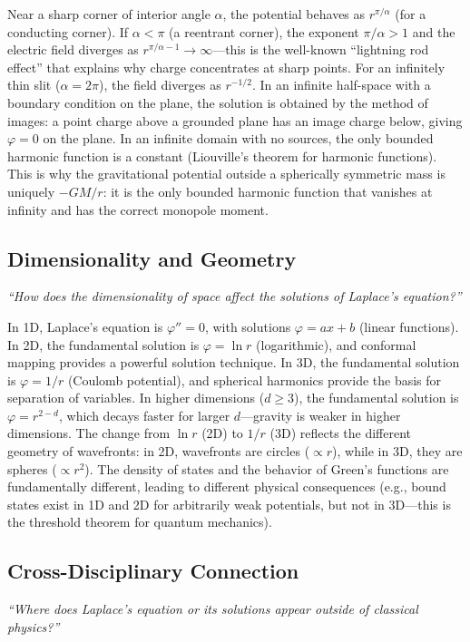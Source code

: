 \documentclass[11pt,openright]{book}
\begin{document}
Near a sharp corner of interior angle $\alpha$, the potential behaves as $r^{\pi/\alpha}$ (for a conducting corner). If $\alpha < \pi$ (a reentrant corner), the exponent $\pi/\alpha > 1$ and the electric field diverges as $r^{\pi/\alpha - 1} \to \infty$---this is the well-known ``lightning rod effect'' that explains why charge concentrates at sharp points. For an infinitely thin slit ($\alpha = 2\pi$), the field diverges as $r^{-1/2}$. In an infinite half-space with a boundary condition on the plane, the solution is obtained by the method of images: a point charge above a grounded plane has an image charge below, giving $\varphi = 0$ on the plane. In an infinite domain with no sources, the only bounded harmonic function is a constant (Liouville's theorem for harmonic functions). This is why the gravitational potential outside a spherically symmetric mass is uniquely $-GM/r$: it is the only bounded harmonic function that vanishes at infinity and has the correct monopole moment.

\subsection*{Dimensionality and Geometry}
\textit{``How does the dimensionality of space affect the solutions of Laplace's equation?''}

In 1D, Laplace's equation is $\varphi'' = 0$, with solutions $\varphi = ax + b$ (linear functions). In 2D, the fundamental solution is $\varphi = \ln r$ (logarithmic), and conformal mapping provides a powerful solution technique. In 3D, the fundamental solution is $\varphi = 1/r$ (Coulomb potential), and spherical harmonics provide the basis for separation of variables. In higher dimensions ($d \geq 3$), the fundamental solution is $\varphi = r^{2-d}$, which decays faster for larger $d$---gravity is weaker in higher dimensions. The change from $\ln r$ (2D) to $1/r$ (3D) reflects the different geometry of wavefronts: in 2D, wavefronts are circles ($\propto r$), while in 3D, they are spheres ($\propto r^{2}$). The density of states and the behavior of Green's functions are fundamentally different, leading to different physical consequences (e.g., bound states exist in 1D and 2D for arbitrarily weak potentials, but not in 3D---this is the threshold theorem for quantum mechanics).

\subsection*{Cross-Disciplinary Connection}
\textit{``Where does Laplace's equation or its solutions appear outside of classical physics?''}
\end{document}
